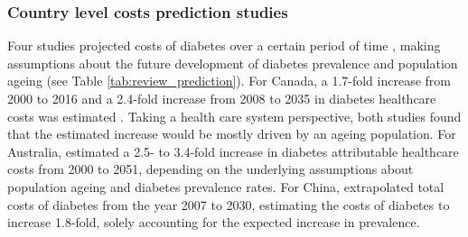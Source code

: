 \subsubsection{Country level costs prediction studies}
Four studies projected costs of diabetes over a certain period of time \parencite{Ohinmaa2004,Lau2011a,Davis2006b,Wang2009f}, making assumptions about the future development of diabetes prevalence and population ageing (see Table \ref{tab:review_prediction}). For Canada, a 1.7-fold increase from 2000 to 2016 \parencite{Ohinmaa2004} and a 2.4-fold increase from 2008 to 2035 in diabetes healthcare costs was estimated \parencite{Lau2011a}. Taking a health care system perspective, both studies found that the estimated increase would be mostly driven by an ageing population. For Australia, \textcite{Davis2006b} estimated a 2.5- to 3.4-fold increase in diabetes attributable healthcare costs from 2000 to 2051, depending on the underlying assumptions about population ageing and diabetes prevalence rates. For China, \textcite{Wang2009f} extrapolated total costs of diabetes from the year 2007 to 2030, estimating the costs of diabetes to increase 1.8-fold, solely accounting for the expected increase in prevalence.

